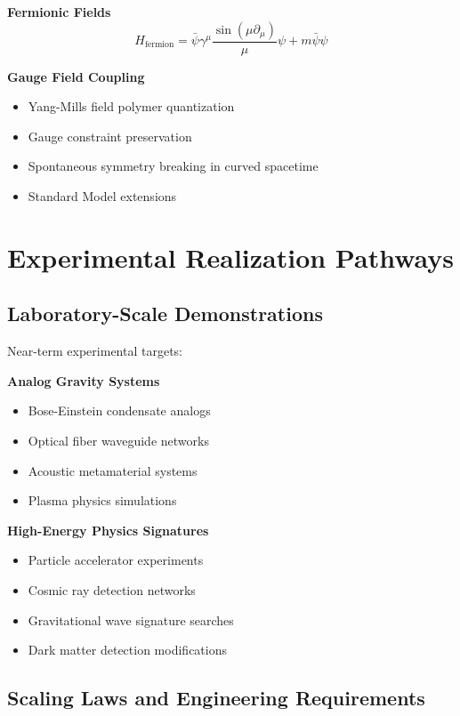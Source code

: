 \documentclass[11pt]{article}
\begin{document}
\textbf{Fermionic Fields}
\begin{equation}
H_{\text{fermion}} = \bar{\psi}\gamma^\mu \frac{\sin(\mu \partial_\mu)}{\mu}\psi + m\bar{\psi}\psi
\end{equation}

\textbf{Gauge Field Coupling}
\begin{itemize}
\item Yang-Mills field polymer quantization
\item Gauge constraint preservation
\item Spontaneous symmetry breaking in curved spacetime
\item Standard Model extensions
\end{itemize}

\section{Experimental Realization Pathways}

\subsection{Laboratory-Scale Demonstrations}

Near-term experimental targets:

\textbf{Analog Gravity Systems}
\begin{itemize}
\item Bose-Einstein condensate analogs
\item Optical fiber waveguide networks
\item Acoustic metamaterial systems
\item Plasma physics simulations
\end{itemize}

\textbf{High-Energy Physics Signatures}
\begin{itemize}
\item Particle accelerator experiments
\item Cosmic ray detection networks
\item Gravitational wave signature searches
\item Dark matter detection modifications
\end{itemize}

\subsection{Scaling Laws and Engineering Requirements}
\end{document}
